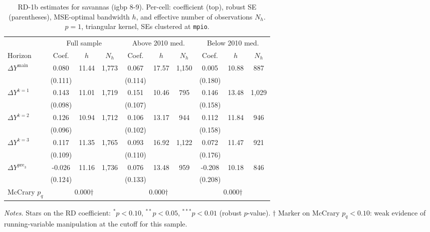 \documentclass[11pt]{article}
\begin{document}
\begin{table}[H]
\centering
\scriptsize
\caption{RD-1b estimates for savannas (igbp 8-9). Per-cell: coefficient
(top), robust SE (parentheses), MSE-optimal bandwidth $h$, and
effective number of observations $N_h$. $p=1$, triangular kernel,
SEs clustered at \texttt{mpio}.}
\label{tab:rdplot_rd1b_savannas}
\begin{tabular}{l ccc ccc ccc}
\toprule
 & \multicolumn{3}{c}{Full sample} & \multicolumn{3}{c}{Above 2010 med.} & \multicolumn{3}{c}{Below 2010 med.} \\
\cmidrule(lr){2-4} \cmidrule(lr){5-7} \cmidrule(lr){8-10}
Horizon & Coef. & $h$ & $N_h$ & Coef. & $h$ & $N_h$ & Coef. & $h$ & $N_h$ \\
\midrule
$\Delta Y^{\text{main}}$ & 0.080 & 11.44 & 1,773 & 0.067 & 17.57 & 1,150 & 0.005 & 10.88 & 887 \\
 & (0.111) &  &  & (0.114) &  &  & (0.180) &  &  \\
\addlinespace[1pt]
$\Delta Y^{k=1}$ & 0.143 & 11.01 & 1,719 & 0.151 & 10.46 & 795 & 0.146 & 13.48 & 1,029 \\
 & (0.098) &  &  & (0.107) &  &  & (0.158) &  &  \\
\addlinespace[1pt]
$\Delta Y^{k=2}$ & 0.126 & 10.94 & 1,712 & 0.106 & 13.17 & 944 & 0.112 & 11.84 & 946 \\
 & (0.096) &  &  & (0.102) &  &  & (0.158) &  &  \\
\addlinespace[1pt]
$\Delta Y^{k=3}$ & 0.117 & 11.35 & 1,765 & 0.093 & 16.92 & 1,122 & 0.072 & 11.47 & 921 \\
 & (0.109) &  &  & (0.110) &  &  & (0.176) &  &  \\
\addlinespace[1pt]
$\Delta Y^{\text{pre}_3}$ & -0.026 & 11.16 & 1,736 & 0.076 & 13.48 & 959 & -0.208 & 10.18 & 846 \\
 & (0.124) &  &  & (0.133) &  &  & (0.208) &  &  \\
\addlinespace[1pt]
\midrule
McCrary $p_q$ & \multicolumn{3}{c}{0.000$\dagger$} & \multicolumn{3}{c}{0.000$\dagger$} & \multicolumn{3}{c}{0.000$\dagger$} \\
\bottomrule
\end{tabular}
\begin{flushleft}\footnotesize
\textit{Notes.} Stars on the RD coefficient: $^{*}p<0.10$,
$^{**}p<0.05$, $^{***}p<0.01$ (robust $p$-value).
$\dagger$ Marker on McCrary $p_q<0.10$: weak evidence of running-variable manipulation at the cutoff for this sample.\\
\end{flushleft}
\end{table}
\end{document}
